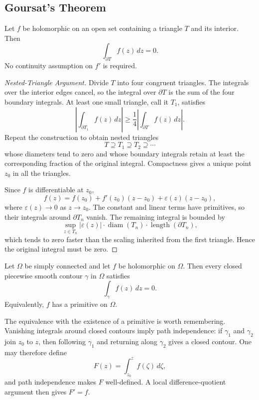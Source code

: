 \subsection{Goursat's Theorem}

\begin{theorem}
Let $f$ be holomorphic on an open set containing a triangle $T$ and its interior. Then
\[
    \int_{\partial T} f(z)\,dz=0.
\]
No continuity assumption on $f'$ is required.
\end{theorem}

\begin{proof}[Nested-Triangle Argument]
Divide $T$ into four congruent triangles. The integrals over the interior edges cancel, so the integral over $\partial T$ is the sum of the four boundary integrals. At least one small triangle, call it $T_1$, satisfies
\[
    \left|\int_{\partial T_1}f(z)\,dz\right|
    \geq \frac14\left|\int_{\partial T}f(z)\,dz\right|.
\]
Repeat the construction to obtain nested triangles
\[
    T\supseteq T_1\supseteq T_2\supseteq\cdots
\]
whose diameters tend to zero and whose boundary integrals retain at least the corresponding fraction of the original integral. Compactness gives a unique point $z_0$ in all the triangles.

Since $f$ is differentiable at $z_0$,
\[
    f(z)=f(z_0)+f'(z_0)(z-z_0)+\varepsilon(z)(z-z_0),
\]
where $\varepsilon(z)\to0$ as $z\to z_0$. The constant and linear terms have primitives, so their integrals around $\partial T_n$ vanish. The remaining integral is bounded by
\[
    \sup_{z\in T_n}|\varepsilon(z)|\cdot
    \operatorname{diam}(T_n)\cdot\operatorname{length}(\partial T_n),
\]
which tends to zero faster than the scaling inherited from the first triangle. Hence the original integral must be zero.
\end{proof}

\begin{theorem}
Let $\Omega$ be simply connected and let $f$ be holomorphic on $\Omega$. Then every closed piecewise smooth contour $\gamma$ in $\Omega$ satisfies
\[
    \int_\gamma f(z)\,dz=0.
\]
Equivalently, $f$ has a primitive on $\Omega$.
\end{theorem}

\begin{remark}
The equivalence with the existence of a primitive is worth remembering. Vanishing integrals around closed contours imply path independence: if $\gamma_1$ and $\gamma_2$ join $z_0$ to $z$, then following $\gamma_1$ and returning along $\gamma_2$ gives a closed contour. One may therefore define
\[
    F(z)=\int_{z_0}^{z}f(\zeta)\,d\zeta,
\]
and path independence makes $F$ well-defined. A local difference-quotient argument then gives $F'=f$.
\end{remark}

